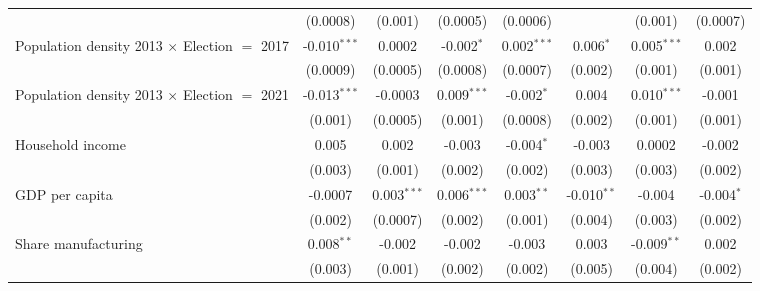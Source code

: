 \begin{table}[htbp]
\begin{tabular}{lccccccc}
                                                              & (0.0008)             & (0.001)               & (0.0005)              & (0.0006)       &                & (0.001)        & (0.0007)\\   
      Population density 2013 $\times$ Election $=$ 2017      & -0.010$^{***}$       & 0.0002                & -0.002$^{*}$          & 0.002$^{***}$  & 0.006$^{*}$    & 0.005$^{***}$  & 0.002\\   
                                                              & (0.0009)             & (0.0005)              & (0.0008)              & (0.0007)       & (0.002)        & (0.001)        & (0.001)\\   
      Population density 2013 $\times$ Election $=$ 2021      & -0.013$^{***}$       & -0.0003               & 0.009$^{***}$         & -0.002$^{*}$   & 0.004          & 0.010$^{***}$  & -0.001\\   
                                                              & (0.001)              & (0.0005)              & (0.001)               & (0.0008)       & (0.002)        & (0.001)        & (0.001)\\   
      Household income                                        & 0.005                & 0.002                 & -0.003                & -0.004$^{*}$   & -0.003         & 0.0002         & -0.002\\   
                                                              & (0.003)              & (0.001)               & (0.002)               & (0.002)        & (0.003)        & (0.003)        & (0.002)\\   
      GDP per capita                                          & -0.0007              & 0.003$^{***}$         & 0.006$^{***}$         & 0.003$^{**}$   & -0.010$^{**}$  & -0.004         & -0.004$^{*}$\\   
                                                              & (0.002)              & (0.0007)              & (0.002)               & (0.001)        & (0.004)        & (0.003)        & (0.002)\\   
      Share manufacturing                                     & 0.008$^{**}$         & -0.002                & -0.002                & -0.003         & 0.003          & -0.009$^{**}$  & 0.002\\   
                                                              & (0.003)              & (0.001)               & (0.002)               & (0.002)        & (0.005)        & (0.004)        & (0.002)\\   

\end{tabular}
\end{table}
